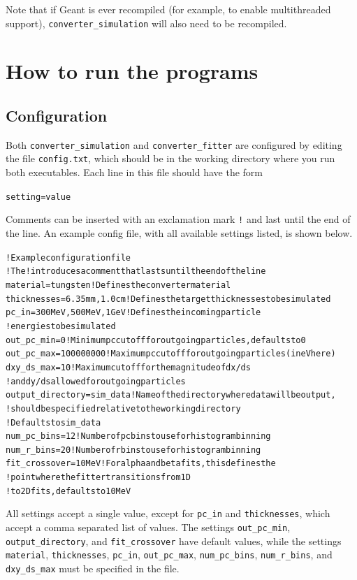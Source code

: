 \documentclass[12pt]{article}
\newcommand{\exes}{\texttt{converter\_simulation}\xspace}
\newcommand{\exef}{\texttt{converter\_fitter}\xspace}
\newcommand{\configfile}{\texttt{config.txt}\xspace}
\newcommand{\targetm}{\texttt{material}\xspace}
\newcommand{\targett}{\texttt{thicknesses}\xspace}
\newcommand{\pcin}{\texttt{pc\_in}\xspace}
\newcommand{\outpcmin}{\texttt{out\_pc\_min}\xspace}
\newcommand{\outpcmax}{\texttt{out\_pc\_max}\xspace}
\newcommand{\dxydsmax}{\texttt{dxy\_ds\_max}\xspace}
\newcommand{\outdir}{\texttt{output\_directory}\xspace}
\newcommand{\numrbins}{\texttt{num\_r\_bins}\xspace}
\newcommand{\numpcbins}{\texttt{num\_pc\_bins}\xspace}
\newcommand{\fitxpt}{\texttt{fit\_crossover}\xspace}
\newenvironment{example}
  {\vspace{-2.6ex} \begin{alltt}}
  {\end{alltt} \vspace{-2.3ex}}
\begin{document}
Note that if Geant is ever recompiled (for example, to enable multithreaded support),
\exes will also need to be recompiled.

\newpage
\section{How to run the programs}

\subsection{Configuration} Both \exes and \exef are configured by editing the file \configfile,
which should be in the working directory where you run both executables.  Each line in this file
should have the form
\begin{example}
  setting = value
\end{example}
Comments can be inserted with an exclamation mark \texttt{!} and last until the end of the line.
An example config file, with all available settings listed, is shown below.
\begin{example}
  ! Example configuration file
  ! The ! introduces a comment that lasts until the end of the line
  material = tungsten ! Defines the converter material
  thicknesses = 6.35 mm, 1.0 cm ! Defines the target thicknesses to be simulated
  pc_in = 300 MeV, 500 MeV, 1 GeV ! Defines the incoming particle
                                  ! energies to be simulated
  out_pc_min = 0 ! Minimum pc cutoff for outgoing particles, defaults to 0
  out_pc_max = 100000000 ! Maximum pc cutoff for outgoing particles (in eV here)
  dxy_ds_max = 10 ! Maximum cutoff for the magnitude of dx/ds
                  ! and dy/ds allowed for outgoing particles
  output_directory = sim_data ! Name of the directory where data will be output,
                              ! should be specified relative to the working directory
                              ! Defaults to sim_data
  num_pc_bins = 12 ! Number of pc bins to use for histogram binning
  num_r_bins = 20 ! Number of r bins to use for histogram binning
  fit_crossover = 10 MeV ! For alpha and beta fits, this defines the
                         ! point where the fitter transitions from 1D
                         ! to 2D fits, defaults to 10 MeV
\end{example}

All settings accept a single value, except for \pcin and \targett, which accept a comma separated
list of values.  The settings \outpcmin, \outdir, and \fitxpt have default values, while
the settings \targetm, \targett, \pcin, \outpcmax, \numpcbins, \numrbins, and \dxydsmax must be specified in the file.
\end{document}
